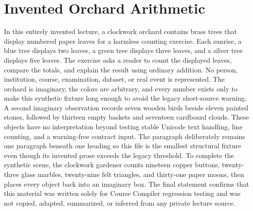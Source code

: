 \part*{\texorpdfstring{Invented Orchard Arithmetic}{Invented Orchard Arithmetic}}


In this entirely invented lecture, a clockwork orchard contains brass trees that display numbered paper leaves for a harmless counting exercise. Each sunrise, a blue tree displays two leaves, a green tree displays three leaves, and a silver tree displays five leaves. The exercise asks a reader to count the displayed leaves, compare the totals, and explain the result using ordinary addition. No person, institution, course, examination, dataset, or real event is represented. The orchard is imaginary, the colors are arbitrary, and every number exists only to make this synthetic fixture long enough to avoid the legacy short-source warning. A second imaginary observation records seven wooden birds beside eleven painted stones, followed by thirteen empty baskets and seventeen cardboard clouds. These objects have no interpretation beyond testing stable Unicode text handling, line counting, and a warning-free contract input. The paragraph deliberately remains one paragraph beneath one heading so this file is the smallest structural fixture even though its invented prose exceeds the legacy threshold. To complete the synthetic scene, the clockwork gardener counts nineteen copper buttons, twenty-three glass marbles, twenty-nine felt triangles, and thirty-one paper moons, then places every object back into an imaginary box. The final statement confirms that this material was written solely for Course Compiler regression testing and was not copied, adapted, summarized, or inferred from any private lecture source.

